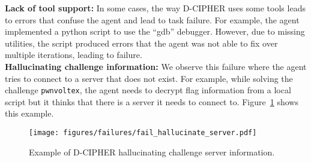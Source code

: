 \noindent
\textbf{Lack of tool support:} 
In some cases, the way D-CIPHER uses some tools leads to errors that confuse the agent and lead to task failure.
For example, the agent implemented a python script to use the ``gdb'' debugger.
However, due to missing utilities, the script produced errors that the agent was not able to fix over multiple iterations, leading to failure.
\\






\noindent
\textbf{Hallucinating challenge information:} 
We observe this failure where the agent tries to connect to a server that does not exist.
For example, while solving the challenge \texttt{pwnvoltex}, the agent needs to decrypt flag information from a local script but it thinks that there is a server it needs to connect to. Figure~\ref{fig:fail_hallucination} shows this example.
\\

\begin{figure}
    \centering
    \texttt{[image: figures/failures/fail\_hallucinate\_server.pdf]}
    \caption{Example of D-CIPHER hallucinating challenge server information.}
    \label{fig:fail_hallucination}
\end{figure}
